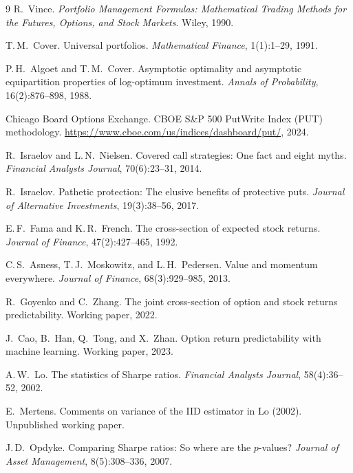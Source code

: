 \documentclass[11pt]{article}
\begin{document}
\begin{thebibliography}{9}
R.~Vince.
\newblock \emph{Portfolio Management Formulas: Mathematical Trading Methods
for the Futures, Options, and Stock Markets}.
\newblock Wiley, 1990.

T.\,M.~Cover.
\newblock Universal portfolios.
\newblock \emph{Mathematical Finance}, 1(1):1--29, 1991.

P.\,H.~Algoet and T.\,M.~Cover.
\newblock Asymptotic optimality and asymptotic equipartition properties
of log-optimum investment.
\newblock \emph{Annals of Probability}, 16(2):876--898, 1988.

Chicago Board Options Exchange.
\newblock CBOE S\&P 500 PutWrite Index (PUT) methodology.
\newblock \url{https://www.cboe.com/us/indices/dashboard/put/}, 2024.

R.~Israelov and L.\,N.~Nielsen.
\newblock Covered call strategies: One fact and eight myths.
\newblock \emph{Financial Analysts Journal}, 70(6):23--31, 2014.

R.~Israelov.
\newblock Pathetic protection: The elusive benefits of protective puts.
\newblock \emph{Journal of Alternative Investments}, 19(3):38--56, 2017.

E.\,F.~Fama and K.\,R.~French.
\newblock The cross-section of expected stock returns.
\newblock \emph{Journal of Finance}, 47(2):427--465, 1992.

C.\,S.~Asness, T.\,J.~Moskowitz, and L.\,H.~Pedersen.
\newblock Value and momentum everywhere.
\newblock \emph{Journal of Finance}, 68(3):929--985, 2013.

R.~Goyenko and C.~Zhang.
\newblock The joint cross-section of option and stock returns predictability.
\newblock Working paper, 2022.

J.~Cao, B.~Han, Q.~Tong, and X.~Zhan.
\newblock Option return predictability with machine learning.
\newblock Working paper, 2023.

A.\,W.~Lo.
\newblock The statistics of Sharpe ratios.
\newblock \emph{Financial Analysts Journal}, 58(4):36--52, 2002.


E.~Mertens.
\newblock Comments on variance of the IID estimator in Lo (2002).
\newblock Unpublished working paper.

J.\,D.~Opdyke.
\newblock Comparing Sharpe ratios: So where are the $p$-values?
\newblock \emph{Journal of Asset Management}, 8(5):308--336, 2007.

\end{thebibliography}
\end{document}
